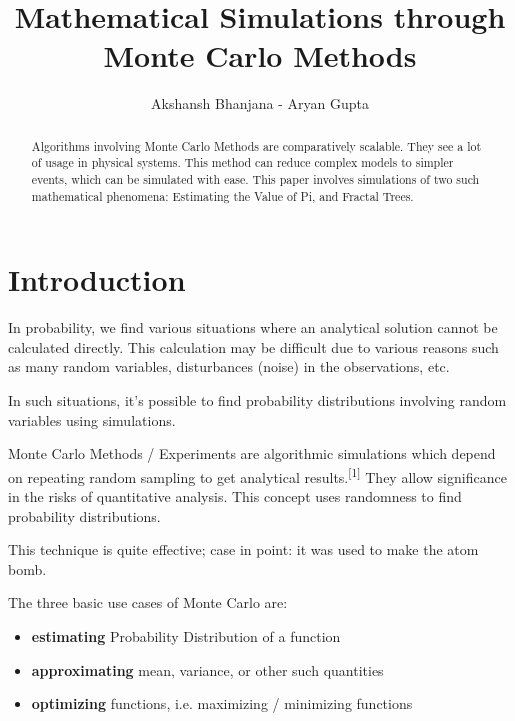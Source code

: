 \documentclass{resonance}
\begin{document}
\title{Mathematical Simulations through Monte Carlo Methods}
\author{Akshansh Bhanjana - Aryan Gupta}

\maketitle
{}

\begin{abstract}
Algorithms involving Monte Carlo Methods are comparatively scalable. They see a lot of usage in physical systems. This method can reduce complex models to simpler events, which can be simulated with ease. This paper involves simulations of two such mathematical phenomena: Estimating the Value of Pi, and Fractal Trees.
\end{abstract}



\section*{Introduction}
In probability, we find various situations where an analytical solution cannot be calculated directly. This calculation may be difficult due to various reasons such as many random variables, disturbances (noise) in the observations, etc.

In such situations, it's possible to find probability distributions involving random variables using simulations.

Monte Carlo Methods / Experiments are algorithmic simulations which depend on repeating random sampling to get analytical results.\textsuperscript{[1]} They allow significance in the risks of quantitative analysis. This concept uses randomness to find probability distributions.

This technique is quite effective; case in point: it was used to make the atom bomb.

The three basic use cases of Monte Carlo are:
\begin{itemize}
    \item \textbf{estimating} Probability Distribution of a function
    \item \textbf{approximating} mean, variance, or other such quantities
    \item \textbf{optimizing} functions, i.e. maximizing / minimizing functions
\end{itemize}
\end{document}
